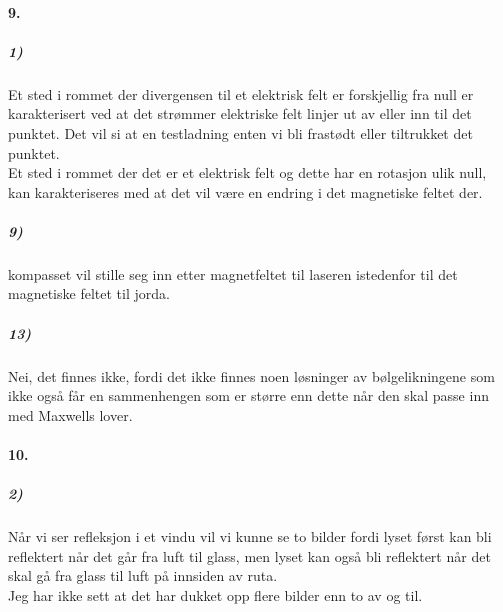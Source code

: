 \documentclass[11pt, A4paper,norsk]{article}
\begin{document}
		\paragraph{9.}
			\subparagraph{1)}
				\begin{flushleft}
Et sted i rommet der divergensen til et elektrisk felt er forskjellig fra null er karakterisert ved at det strømmer elektriske felt linjer ut av eller inn til det punktet. Det vil si at en testladning enten vi bli frastødt eller tiltrukket det punktet. \\
Et sted i rommet der det er et elektrisk felt og dette har en rotasjon ulik null, kan karakteriseres med at det vil være en endring i det magnetiske feltet der.
				\end{flushleft}










			\subparagraph{9)}
				\begin{flushleft}
kompasset vil stille seg inn etter magnetfeltet til laseren istedenfor til det magnetiske feltet til jorda.
				\end{flushleft}









			\subparagraph{13)}
				\begin{flushleft}
Nei, det finnes ikke, fordi det ikke finnes noen løsninger av bølgelikningene som ikke også får en sammenhengen som er større enn dette når den skal passe inn med Maxwells lover.
				\end{flushleft}









		\paragraph{10.}
			\subparagraph{2)}
				\begin{flushleft}
Når vi ser refleksjon i et vindu vil vi kunne se to bilder fordi lyset først kan bli reflektert når det går fra luft til glass, men lyset kan også bli reflektert når det skal gå fra glass til luft på innsiden av ruta. \\
Jeg har ikke sett at det har dukket opp flere bilder enn to av og til.
				\end{flushleft}
\end{document}
